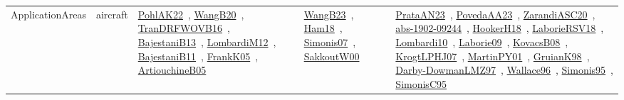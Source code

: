{\begin{longtable}{lp{3cm}>{\raggedright\arraybackslash}p{6cm}>{\raggedright\arraybackslash}p{6cm}>{\raggedright\arraybackslash}p{8cm}}
ApplicationAreas & aircraft & \href{works/PohlAK22.pdf}{PohlAK22}~\cite{PohlAK22}, \href{works/WangB20.pdf}{WangB20}~\cite{WangB20}, \href{works/TranDRFWOVB16.pdf}{TranDRFWOVB16}~\cite{TranDRFWOVB16}, \href{works/BajestaniB13.pdf}{BajestaniB13}~\cite{BajestaniB13}, \href{works/LombardiM12.pdf}{LombardiM12}~\cite{LombardiM12}, \href{works/BajestaniB11.pdf}{BajestaniB11}~\cite{BajestaniB11}, \href{works/FrankK05.pdf}{FrankK05}~\cite{FrankK05}, \href{works/ArtiouchineB05.pdf}{ArtiouchineB05}~\cite{ArtiouchineB05} & \href{works/WangB23.pdf}{WangB23}~\cite{WangB23}, \href{works/Ham18.pdf}{Ham18}~\cite{Ham18}, \href{works/Simonis07.pdf}{Simonis07}~\cite{Simonis07}, \href{works/SakkoutW00.pdf}{SakkoutW00}~\cite{SakkoutW00} & \href{works/PrataAN23.pdf}{PrataAN23}~\cite{PrataAN23}, \href{works/PovedaAA23.pdf}{PovedaAA23}~\cite{PovedaAA23}, \href{works/ZarandiASC20.pdf}{ZarandiASC20}~\cite{ZarandiASC20}, \href{works/abs-1902-09244.pdf}{abs-1902-09244}~\cite{abs-1902-09244}, \href{works/HookerH18.pdf}{HookerH18}~\cite{HookerH18}, \href{works/LaborieRSV18.pdf}{LaborieRSV18}~\cite{LaborieRSV18}, \href{works/Lombardi10.pdf}{Lombardi10}~\cite{Lombardi10}, \href{works/Laborie09.pdf}{Laborie09}~\cite{Laborie09}, \href{works/KovacsB08.pdf}{KovacsB08}~\cite{KovacsB08}, \href{works/KrogtLPHJ07.pdf}{KrogtLPHJ07}~\cite{KrogtLPHJ07}, \href{works/MartinPY01.pdf}{MartinPY01}~\cite{MartinPY01}, \href{works/GruianK98.pdf}{GruianK98}~\cite{GruianK98}, \href{works/Darby-DowmanLMZ97.pdf}{Darby-DowmanLMZ97}~\cite{Darby-DowmanLMZ97}, \href{works/Wallace96.pdf}{Wallace96}~\cite{Wallace96}, \href{works/Simonis95.pdf}{Simonis95}~\cite{Simonis95}, \href{works/SimonisC95.pdf}{SimonisC95}~\cite{SimonisC95}\\

\end{longtable}}
